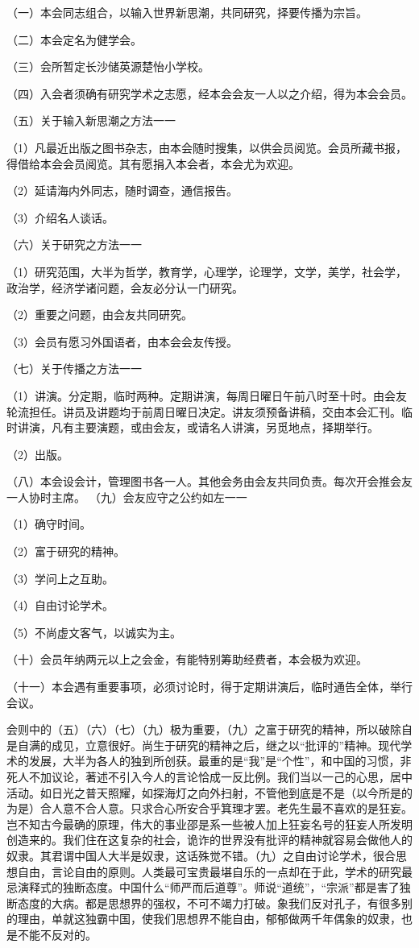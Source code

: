 （一）本会同志组合，以输入世界新思潮，共同研究，择要传播为宗旨。

（二）本会定名为健学会。

（三）会所暂定长沙储英源楚怡小学校。

（四）入会者须确有研究学术之志愿，经本会会友一人以之介绍，得为本会会员。

（五）关于输入新思潮之方法一一

（1）凡最近出版之图书杂志，由本会随时搜集，以供会员阅览。会员所藏书报，得借给本会会员阅览。其有愿捐入本会者，本会尤为欢迎。

（2）延请海内外同志，随时调查，通信报告。

（3）介绍名人谈话。

（六）关于研究之方法一一

（1）研究范围，大半为哲学，教育学，心理学，论理学，文学，美学，社会学，政治学，经济学诸问题，会友必分认一门研究。

（2）重要之问题，由会友共同研究。

（3）会员有愿习外国语者，由本会会友传授。

（七）关于传播之方法一一

（1）讲演。分定期，临时两种。定期讲演，每周日曜日午前八时至十时。由会友轮流担任。讲员及讲题均于前周日曜日决定。讲友须预备讲稿，交由本会汇刊。临时讲演，凡有主要演题，或由会友，或请名人讲演，另觅地点，择期举行。

（2）出版。

 （八）本会设会计，管理图书各一人。其他会务由会友共同负责。每次开会推会友一人协时主席。 
（九）会友应守之公约如左一一

（1）确守时间。

（2）富于研究的精神。

（3）学问上之互助。

（4）自由讨论学术。

（5）不尚虚文客气，以诚实为主。

（十）会员年纳两元以上之会金，有能特别筹助经费者，本会极为欢迎。

（十一）本会遇有重要事项，必须讨论时，得于定期讲演后，临时通告全体，举行会议。

会则中的（五）（六）（七）（九）极为重要，（九）之富于研究的精神，所以破除自是自满的成见，立意很好。尚生于研究的精神之后，继之以“批评的”精神。现代学术的发展，大半为各人的独到所创获。最重的是“我”是“个性”，和中国的习惯，非死人不加议论，著述不引入今人的言论恰成一反比例。我们当以一己的心思，居中活动。如日光之普天照耀，如探海灯之向外扫射，不管他到底是不是（以今所是的为是）合人意不合人意。只求合心所安合乎箕理才罢。老先生最不喜欢的是狂妄。岂不知古今最确的原理，伟大的事业邵是系一些被人加上狂妄名号的狂妄人所发明创造来的。我们住在这复杂的社会，诡诈的世界没有批评的精神就容易会做他人的奴隶。其君谓中国人大半是奴隶，这话殊觉不错。（九）之自由讨论学术，很合思想自由，言论自由的原则。人类最可宝贵最堪自乐的一点却在于此，学术的研究最忌演释式的独断态度。中国什么“师严而后道尊”。师说“道统”，“宗派”都是害了独断态度的大病。都是思想界的强权，不可不竭力打破。象我们反对孔子，有很多别的理由，单就这独霸中国，使我们思想界不能自由，郁郁做两千年偶象的奴隶，也是不能不反对的。

